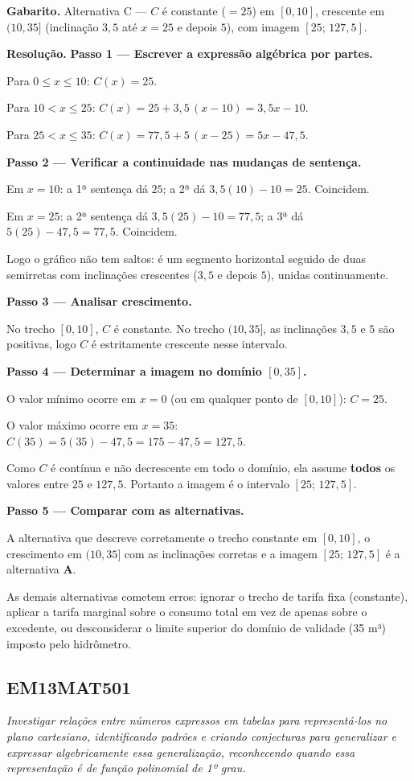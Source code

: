 \documentclass[11pt,a4paper]{article}
\begin{document}
\textbf{Gabarito.} Alternativa C — $C$ é constante ($=25$) em $[0,10]$, crescente em $(10,35]$ (inclinação $3{,}5$ até $x=25$ e depois $5$), com imagem $[25;\,127{,}5]$.

\textbf{Resolução.} \textbf{Passo 1 — Escrever a expressão algébrica por partes.}

Para $0 \le x \le 10$: $C(x) = 25$.

Para $10 < x \le 25$: $C(x) = 25 + 3{,}5\,(x-10) = 3{,}5x - 10$.

Para $25 < x \le 35$: $C(x) = 77{,}5 + 5\,(x-25) = 5x - 47{,}5$.

\textbf{Passo 2 — Verificar a continuidade nas mudanças de sentença.}

Em $x=10$: a 1ª sentença dá $25$; a 2ª dá $3{,}5(10)-10 = 25$. Coincidem.

Em $x=25$: a 2ª sentença dá $3{,}5(25)-10 = 77{,}5$; a 3ª dá $5(25)-47{,}5 = 77{,}5$. Coincidem.

Logo o gráfico não tem saltos: é um segmento horizontal seguido de duas semirretas com inclinações crescentes ($3{,}5$ e depois $5$), unidas continuamente.

\textbf{Passo 3 — Analisar crescimento.}

No trecho $[0,10]$, $C$ é constante. No trecho $(10,35]$, as inclinações $3{,}5$ e $5$ são positivas, logo $C$ é estritamente crescente nesse intervalo.

\textbf{Passo 4 — Determinar a imagem no domínio $[0,35]$.}

O valor mínimo ocorre em $x=0$ (ou em qualquer ponto de $[0,10]$): $C=25$.

O valor máximo ocorre em $x=35$: $C(35) = 5(35) - 47{,}5 = 175 - 47{,}5 = 127{,}5$.

Como $C$ é contínua e não decrescente em todo o domínio, ela assume \textbf{todos} os valores entre $25$ e $127{,}5$. Portanto a imagem é o intervalo $[25;\,127{,}5]$.

\textbf{Passo 5 — Comparar com as alternativas.}

A alternativa que descreve corretamente o trecho constante em $[0,10]$, o crescimento em $(10,35]$ com as inclinações corretas e a imagem $[25;\,127{,}5]$ é a alternativa \textbf{A}.

As demais alternativas cometem erros: ignorar o trecho de tarifa fixa (constante), aplicar a tarifa marginal sobre o consumo total em vez de apenas sobre o excedente, ou desconsiderar o limite superior do domínio de validade (35 m³) imposto pelo hidrômetro.
\subsection*{EM13MAT501}
{\small\itshape Investigar relações entre números expressos em tabelas para representá-los no plano cartesiano, identificando padrões e criando conjecturas para generalizar e expressar algebricamente essa generalização, reconhecendo quando essa representação é de função polinomial de 1º grau.}
\end{document}
